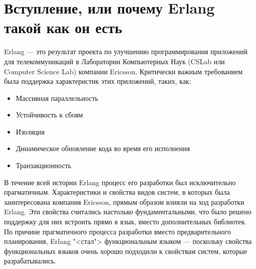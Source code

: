 \chapter{Вступление, или почему Erlang такой как он есть}
\label{background}

Erlang --- это результат проекта по улучшению программирования приложений для 
телекоммуникаций в Лаборатории Компьютерных Наук (CSLab или Computer Science Lab)
компании Ericsson. Критически важным требованием была поддержка характеристик 
этих приложений, таких, как: 

\begin{itemize}
\item Массивная параллельность

\item Устойчивость к сбоям

\item Изоляция

\item Динамическое обновление кода во время его исполнения

\item Транзакционность
\end{itemize}

В течение всей истории Erlang процесс его разработки был исключительно 
прагматичным. Характеристики и свойства видов систем, в которых была заинтересована
компания Ericsson, прямым образом влияли на ход разработки Erlang. Эти свойства
считались настолько фундаментальными, что было решено поддержку для них встроить
прямо в язык, вместо дополнительных библиотек. По причине прагматичного процесса
разработки вместо предварительного планирования, Erlang "<стал"> функциональным
языком --- поскольку свойства функциональных языков очень хорошо подходили к
свойствам систем, которые разрабатывались.


